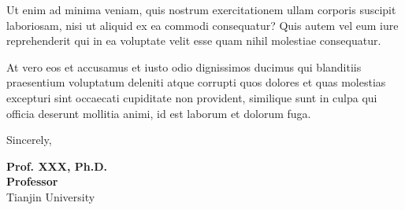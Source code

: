 \documentclass[10pt,a4paper]{article}
\begin{document}
Ut enim ad minima veniam, quis nostrum exercitationem ullam corporis suscipit laboriosam, nisi ut aliquid ex ea commodi consequatur? Quis autem vel eum iure reprehenderit qui in ea voluptate velit esse quam nihil molestiae consequatur.

At vero eos et accusamus et iusto odio dignissimos ducimus qui blanditiis praesentium voluptatum deleniti atque corrupti quos dolores et quas molestias excepturi sint occaecati cupiditate non provident, similique sunt in culpa qui officia deserunt mollitia animi, id est laborum et dolorum fuga.

\vspace{2em}

Sincerely,

\vspace{0.5em}

\textbf{Prof. XXX, Ph.D.}\\
\textbf{Professor}\\
Tianjin University
\end{document}
